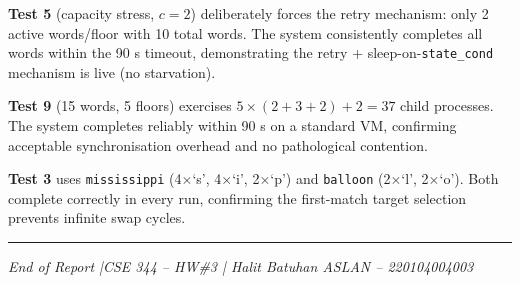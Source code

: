 \documentclass[12pt,a4paper]{article}
\newcommand{\code}[1]{\texttt{\small #1}}
\begin{document}
\textbf{Test 5} (capacity stress, $c=2$) deliberately forces the retry mechanism:
only 2 active words/floor with 10 total words. The system consistently completes
all words within the 90 s timeout, demonstrating the retry + sleep-on-\code{state\_cond}
mechanism is live (no starvation).

\textbf{Test 9} (15 words, 5 floors) exercises $5 \times (2+3+2) + 2 = 37$ child
processes. The system completes reliably within 90 s on a standard VM, confirming
acceptable synchronisation overhead and no pathological contention.

\textbf{Test 3} uses \texttt{mississippi} (4$\times$`s', 4$\times$`i', 2$\times$`p') and
\texttt{balloon} (2$\times$`l', 2$\times$`o'). Both complete correctly in every run,
confirming the first-match target selection prevents infinite swap cycles.

\vspace{1.5cm}
\noindent\rule{\textwidth}{0.8pt}
\begin{center}
\small\textit{End of Report \quad|\quad CSE 344 -- HW\#3 \quad|\quad
Halit Batuhan ASLAN -- 220104004003}
\end{center}
\end{document}
